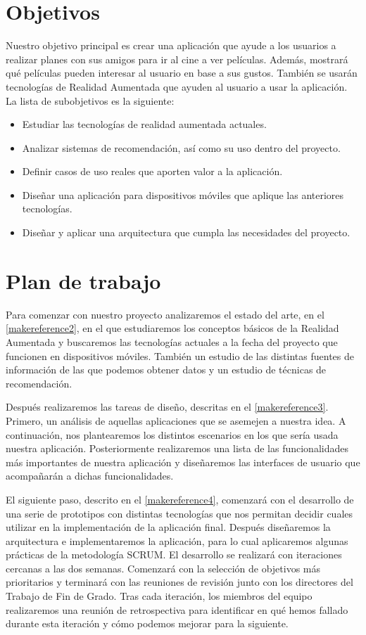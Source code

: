 \section{Objetivos}
\label{makereference1.2}
Nuestro objetivo principal es crear una aplicación que ayude a los usuarios a
realizar planes con sus amigos para ir al cine a ver películas. Además,
mostrará qué películas pueden interesar al usuario en base a sus gustos.
También se usarán tecnologías de Realidad Aumentada que ayuden al usuario a usar
la aplicación.
La lista de subobjetivos es la siguiente:
\begin{itemize}  
    \item Estudiar las tecnologías de realidad aumentada actuales.
    \item Analizar sistemas de recomendación, así como su uso dentro del
     proyecto.
    \item Definir casos de uso reales que aporten valor a la aplicación.
    \item Diseñar una aplicación para dispositivos móviles que aplique las
     anteriores tecnologías.
    \item Diseñar y aplicar una arquitectura que cumpla las necesidades del
     proyecto.
\end{itemize}

\section{Plan de trabajo}
\label{makereference1.3}

Para comenzar con nuestro proyecto analizaremos el estado del arte, en el
 \autoref{makereference2}, en el que estudiaremos los conceptos básicos de la
 Realidad Aumentada y buscaremos las tecnologías actuales a la fecha del proyecto
 que funcionen en dispositivos móviles. También un estudio de las distintas
 fuentes de información de las que podemos obtener datos y un estudio de
 técnicas de recomendación.

Después realizaremos las tareas de diseño, descritas en el
 \autoref{makereference3}. Primero, un análisis de aquellas aplicaciones que se
 asemejen a nuestra idea. A continuación, nos plantearemos los distintos
 escenarios en los que sería usada nuestra aplicación. Posteriormente
 realizaremos una lista de las funcionalidades más importantes de nuestra
 aplicación y diseñaremos las interfaces de usuario que acompañarán a dichas
 funcionalidades. 
   
El siguiente paso, descrito en el \autoref{makereference4}, comenzará con
 el desarrollo de una serie de prototipos con distintas tecnologías que nos permitan
 decidir cuales utilizar en la implementación de la aplicación final. Después diseñaremos la
 arquitectura e implementaremos la aplicación, para lo cual aplicaremos algunas
 prácticas de la metodología SCRUM. El desarrollo se realizará con iteraciones
 cercanas a las dos semanas. Comenzará con la selección de objetivos más
 prioritarios y terminará con las reuniones de revisión junto con los directores
 del Trabajo de Fin de Grado. Tras cada iteración, los miembros del equipo
 realizaremos una reunión de retrospectiva para identificar en qué hemos fallado
 durante esta iteración y cómo podemos mejorar para la siguiente.

